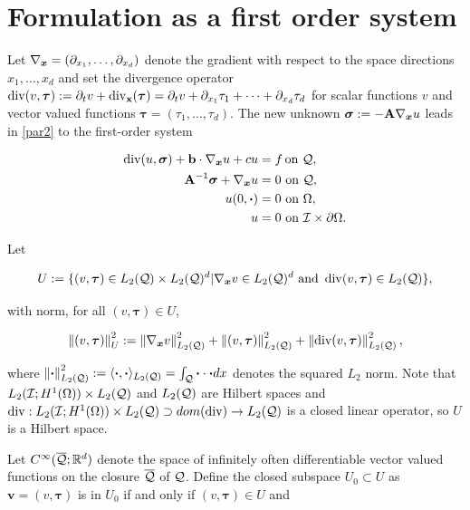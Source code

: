 \section{Formulation as a first order system}

Let $\nabla_{\boldsymbol{x}}=(\partial_{x_1},\dots,\partial_{x_d})$ denote the gradient with respect to the space directions $x_1,\dots,x_d$ and set the divergence operator $\operatorname{div}(v,\boldsymbol{\tau}):=\partial_t v+\operatorname{div}_\mathbf{x}(\boldsymbol{\tau})=\partial_t v+\partial_{x_1}\tau_1+\dots+\partial_{x_d}\tau_d$ for scalar functions $v$ and vector valued functions $\boldsymbol{\tau}=(\tau_1,\dots,\tau_d)$. The new unknown $\boldsymbol{\sigma}:=-\mathbf{A}\nabla_{\boldsymbol{x}} u$ leads in \eqref{par2} to the first-order system

\begin{subequations}\label{par1}
    \begin{align}
        \dv(u,\boldsymbol{\sigma})+\mathbf{b}\cdot\nab u+cu&=f \hspace{-0.05 cm}\text{ on }\cyl,\\
        \mathbf{A}^{-1}\boldsymbol{\sigma}+\nab u &=0 \text{ on }\cyl,\\
        u(0,\boldsymbol{\cdot})&=0 \text{ on }\Omega,\\
        u &= 0 \text{ on }\mathcal{I}\times\partial\Omega.
    \end{align}
\end{subequations}

\newpage

Let

$$U:=\{(v,\boldsymbol{\tau})\in L_2(\mathcal{Q})\times L_2(\mathcal{Q})^d|\nabla_{\boldsymbol{x}} v\in L_2(\mathcal{Q})^d \text{ and } \operatorname{div}(v,\boldsymbol{\tau})\in L_2(\mathcal{Q})\},$$

with norm, for all $(v,\boldsymbol{\tau})\in U$,

$$\left\lVert(v,\boldsymbol{\tau}) \right\rVert_U^2:=\left\lVert\nabla_{\boldsymbol{x}} v \right\rVert_{L_2(\mathcal{Q})}^2+\left\lVert(v,\boldsymbol{\tau}) \right\rVert_{L_2(\mathcal{Q})}^2+\left\lVert\operatorname{div}(v,\boldsymbol{\tau}) \right\rVert_{L_2(\mathcal{Q})}^2,$$

where $\left\lVert\boldsymbol{\cdot} \right\rVert_{L_2(\mathcal{Q})}^2:=\langle\boldsymbol{\cdot},\boldsymbol{\cdot}\rangle_{L_2(\mathcal{Q})}=\int_{\mathcal{Q}}\boldsymbol{\cdot}\cdot\boldsymbol{\cdot} dx$ denotes the squared $L_2$ norm. Note that $L_2(\mathcal{I};H^1(\Omega))\times L_2(\mathcal{Q})$ and $L_2(\mathcal{Q})$ are Hilbert spaces and $\operatorname{div}:L_2(\mathcal{I};H^1(\Omega))\times L_2(\mathcal{Q})\supset dom(\operatorname{div})\to L_2(\mathcal{Q})$ is a closed linear operator, so $U$ is a Hilbert space.

\vspace{0.3 cm}

Let $C^\infty(\overline{\mathcal{Q}};\mathbb{R}^d)$ denote the space of infinitely often differentiable vector valued functions on the closure $\overline{\mathcal{Q}}$ of $\mathcal{Q}$. Define the closed subspace $U_0\subset U$ as $\mathbf{v}=(v,\boldsymbol{\tau})$ is in $U_0$ if and only if $(v,\boldsymbol{\tau})\in U$ and

